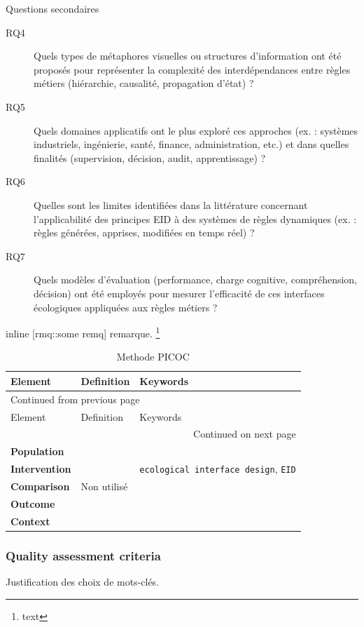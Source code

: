 \documentclass[11pt]{article}
\begin{document}
Questions secondaires
\begin{description}
\item[{\label{orgaa71ef6}RQ4}] Quels types de métaphores visuelles ou structures d’information ont été proposés pour représenter la complexité des interdépendances entre règles métiers (hiérarchie, causalité, propagation d’état) ?
\item[{\label{org1ee453a}RQ5}] Quels domaines applicatifs ont le plus exploré ces approches (ex. : systèmes industriels, ingénierie, santé, finance, administration, etc.) et dans quelles finalités (supervision, décision, audit, apprentissage) ?
\item[{\label{orgacde9b6}RQ6}] Quelles sont les limites identifiées dans la littérature concernant l’applicabilité des principes EID à des systèmes de règles dynamiques (ex. : règles générées, apprises, modifiées en temps réel) ?
\item[{\label{org922a236}RQ7}] Quels modèles d’évaluation (performance, charge cognitive, compréhension, décision) ont été employés pour mesurer l’efficacité de ces interfaces écologiques appliquées aux règles métiers ?
\end{description}



inline [rmq::some remq] remarque. \footnote{text}

\begin{longtable}{|p{3cm}|p{5cm}|p{7cm}|}
\caption{\label{tab:org64ddc88}Methode PICOC}
\\
\hline
Element & Definition & Keywords\\
\hline
\endfirsthead
\multicolumn{3}{l}{Continued from previous page} \\
\hline

Element & Definition & Keywords \\

\hline
\endhead
\hline\multicolumn{3}{r}{Continued on next page} \\
\endfoot
\endlastfoot
\hline
\textbf{\textbf{Population}} &  & \\
\textbf{\textbf{Intervention}} &  & \texttt{ecological interface design}, \texttt{EID}\\
\textbf{\textbf{Comparison}} & Non utilisé & \\
\textbf{\textbf{Outcome}} &  & \\
\textbf{\textbf{Context}} &  & \\
\hline
\end{longtable}
\subsubsection{Quality assessment criteria}
\label{sec:orgdfa250d}
Justification des choix de mots-clés.
\end{document}
